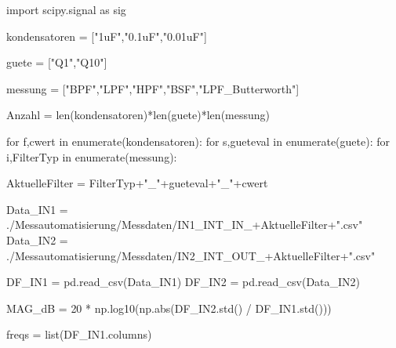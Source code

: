 \documentclass[
  ngerman,
  letterpaper,
  DIV=11]{scrreprt}
\newenvironment{Shaded}{}{}
\newcommand{\BuiltInTok}[1]{\textcolor[rgb]{0.84,0.23,0.29}{#1}}
\newcommand{\ControlFlowTok}[1]{\textcolor[rgb]{0.84,0.23,0.29}{#1}}
\newcommand{\DecValTok}[1]{\textcolor[rgb]{0.00,0.36,0.77}{#1}}
\newcommand{\ImportTok}[1]{\textcolor[rgb]{0.01,0.18,0.38}{#1}}
\newcommand{\KeywordTok}[1]{\textcolor[rgb]{0.84,0.23,0.29}{#1}}
\newcommand{\NormalTok}[1]{\textcolor[rgb]{0.14,0.16,0.18}{#1}}
\newcommand{\OperatorTok}[1]{\textcolor[rgb]{0.14,0.16,0.18}{#1}}
\newcommand{\StringTok}[1]{\textcolor[rgb]{0.01,0.18,0.38}{#1}}
\begin{document}
\begin{Shaded}
\begin{Highlighting}[]
\ImportTok{import}\NormalTok{ scipy.signal }\ImportTok{as}\NormalTok{ sig}

\NormalTok{kondensatoren }\OperatorTok{=}\NormalTok{ [}\StringTok{"1uF"}\NormalTok{,}\StringTok{"0.1uF"}\NormalTok{,}\StringTok{"0.01uF"}\NormalTok{]}

\NormalTok{guete }\OperatorTok{=}\NormalTok{ [}\StringTok{"Q1"}\NormalTok{,}\StringTok{"Q10"}\NormalTok{]}

\NormalTok{messung }\OperatorTok{=}\NormalTok{ [}\StringTok{"BPF"}\NormalTok{,}\StringTok{"LPF"}\NormalTok{,}\StringTok{"HPF"}\NormalTok{,}\StringTok{"BSF"}\NormalTok{,}\StringTok{"LPF\_Butterworth"}\NormalTok{]}

\NormalTok{Anzahl }\OperatorTok{=} \BuiltInTok{len}\NormalTok{(kondensatoren)}\OperatorTok{*}\BuiltInTok{len}\NormalTok{(guete)}\OperatorTok{*}\BuiltInTok{len}\NormalTok{(messung)}

\ControlFlowTok{for}\NormalTok{ f,cwert }\KeywordTok{in} \BuiltInTok{enumerate}\NormalTok{(kondensatoren):}
    \ControlFlowTok{for}\NormalTok{ s,gueteval }\KeywordTok{in} \BuiltInTok{enumerate}\NormalTok{(guete):}
        \ControlFlowTok{for}\NormalTok{ i,FilterTyp }\KeywordTok{in} \BuiltInTok{enumerate}\NormalTok{(messung):}

\NormalTok{            AktuelleFilter }\OperatorTok{=}\NormalTok{ FilterTyp}\OperatorTok{+}\StringTok{"\_"}\OperatorTok{+}\NormalTok{gueteval}\OperatorTok{+}\StringTok{"\_"}\OperatorTok{+}\NormalTok{cwert}

\NormalTok{            Data\_IN1 }\OperatorTok{=} \StringTok{\textquotesingle{}./Messautomatisierung/Messdaten/IN1\_INT\_IN\_\textquotesingle{}}\OperatorTok{+}\NormalTok{AktuelleFilter}\OperatorTok{+}\StringTok{".csv"}
\NormalTok{            Data\_IN2 }\OperatorTok{=} \StringTok{\textquotesingle{}./Messautomatisierung/Messdaten/IN2\_INT\_OUT\_\textquotesingle{}}\OperatorTok{+}\NormalTok{AktuelleFilter}\OperatorTok{+}\StringTok{".csv"}

\NormalTok{            DF\_IN1 }\OperatorTok{=}\NormalTok{ pd.read\_csv(Data\_IN1)}
\NormalTok{            DF\_IN2 }\OperatorTok{=}\NormalTok{ pd.read\_csv(Data\_IN2)}

\NormalTok{            MAG\_dB }\OperatorTok{=} \DecValTok{20} \OperatorTok{*}\NormalTok{ np.log10(np.}\BuiltInTok{abs}\NormalTok{(DF\_IN2.std() }\OperatorTok{/}\NormalTok{ DF\_IN1.std()))}

            
\NormalTok{            freqs }\OperatorTok{=} \BuiltInTok{list}\NormalTok{(DF\_IN1.columns)}


\end{Highlighting}
\end{Shaded}
\end{document}
